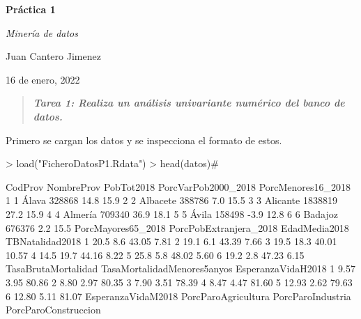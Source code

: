 \documentclass[11pt]{article}
\begin{document}




\begin{centering}
{\huge \bf Práctica 1} \smallskip

{\Large \em Minería de datos

Juan Cantero Jimenez

16 de enero, 2022

}
\end{centering}

\vspace{3pc}
\begin{quote}\em {\bf Tarea 1: Realiza un análisis univariante numérico del banco de datos.}
\end{quote}
Primero se cargan los datos y se inspecciona el formato de estos.
\begin{Schunk}
\begin{Sinput}
> load("FicheroDatosP1.Rdata")
> head(datos)#
\end{Sinput}
\begin{Soutput}
  CodProv NombreProv PobTot2018 PorcVarPob2000_2018 PorcMenores16_2018
1       1      Álava     328868                14.8               15.9
2       2   Albacete     388786                 7.0               15.5
3       3   Alicante    1838819                27.2               15.9
4       4    Almería     709340                36.9               18.1
5       5      Ávila     158498                -3.9               12.8
6       6    Badajoz     676376                 2.2               15.5
  PorcMayores65_2018 PorcPobExtranjera_2018 EdadMedia2018 TBNatalidad2018
1               20.5                    8.6         43.05            7.81
2               19.1                    6.1         43.39            7.66
3               19.5                   18.3         40.01           10.57
4               14.5                   19.7         44.16            8.22
5               25.8                    5.8         48.02            5.60
6               19.2                    2.8         47.23            6.15
  TasaBrutaMortalidad TasaMortalidadMenores5anyos EsperanzaVidaH2018
1                9.57                        3.95              80.86
2                8.80                        2.97              80.35
3                7.90                        3.51              78.39
4                8.47                        4.47              81.60
5               12.93                        2.62              79.63
6               12.80                        5.11              81.07
  EsperanzaVidaM2018 PorcParoAgricultura PorcParoIndustria PorcParoConstruccion

\end{Soutput}
\end{Schunk}
\end{document}
